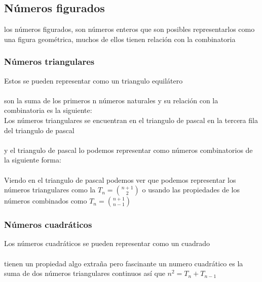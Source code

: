\subsection{Números figurados}
los números figurados, son números enteros  que son posibles representarlos como una figura geométrica, muchos de ellos tienen relación con la combinatoria
\subsubsection{Números triangulares}
Estos se pueden representar como un triangulo equilátero
\\
\\son la suma de los primeros n números naturales y su relación con la combinatoria es la siguiente:
\\Los números triangulares se encuentran en el triangulo de pascal en la tercera fila del triangulo de pascal
\\
\\y el triangulo de pascal lo podemos representar como números combinatorios de la siguiente forma:
\\
\\Viendo en el triangulo de pascal podemos ver que podemos representar los números triangulares como la  $T_{n}=\binom{n+1}{2} $ o usando las propiedades de los números combinados como   $T_{n}=\binom{n+1}{n-1}$
\subsubsection{Números cuadráticos}
Los números cuadráticos se pueden representar como un cuadrado
\\
\\tienen un propiedad  algo extraña pero fascinante un numero cuadrático es la suma de dos números triangulares continuos así que $n^{2} = T_{n} + T_{n-1}$

